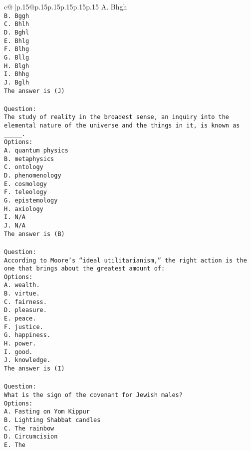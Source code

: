 \documentclass{article}
\begin{document}
{\begin{supertabular}{c@{$\;$}|p{.15\linewidth}@{}p{.15\linewidth}p{.15\linewidth}p{.15\linewidth}p{.15\linewidth}p{.15\linewidth}}
{{{A. Bhgh\\ \tt B. Bggh\\ \tt C. Bhlh\\ \tt D. Bghl\\ \tt E. Bhlg\\ \tt F. Blhg\\ \tt G. Bllg\\ \tt H. Blgh\\ \tt I. Bhhg\\ \tt J. Bglh\\ \tt The answer is (J)\\ \tt \\ \tt Question:\\ \tt The study of reality in the broadest sense, an inquiry into the elemental nature of the universe and the things in it, is known as _____.\\ \tt Options:\\ \tt A. quantum physics\\ \tt B. metaphysics\\ \tt C. ontology\\ \tt D. phenomenology\\ \tt E. cosmology\\ \tt F. teleology\\ \tt G. epistemology\\ \tt H. axiology\\ \tt I. N/A\\ \tt J. N/A\\ \tt The answer is (B)\\ \tt \\ \tt Question:\\ \tt According to Moore’s “ideal utilitarianism,” the right action is the one that brings about the greatest amount of:\\ \tt Options:\\ \tt A. wealth.\\ \tt B. virtue.\\ \tt C. fairness.\\ \tt D. pleasure.\\ \tt E. peace.\\ \tt F. justice.\\ \tt G. happiness.\\ \tt H. power.\\ \tt I. good.\\ \tt J. knowledge.\\ \tt The answer is (I)\\ \tt \\ \tt Question:\\ \tt What is the sign of the covenant for Jewish males?\\ \tt Options:\\ \tt A. Fasting on Yom Kippur\\ \tt B. Lighting Shabbat candles\\ \tt C. The rainbow\\ \tt D. Circumcision\\ \tt E. The }}}
\end{supertabular}}
\end{document}
